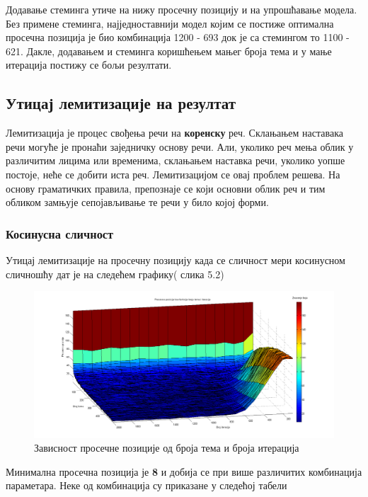 Додавање стеминга утиче на нижу просечну позицију и на упрошћавање модела. Без примене стеминга, најједноставнији модел којим се постиже оптимална просечна позиција је био комбинација 1200 - 693 док је са стемингом то 1100 - 621. Дакле, додавањем и стеминга коришћењем мањег броја тема и у мање итерација постижу се бољи резултати. 



\subsection{Утицај лемитизације на резултат}

Лемитизација је процес свођења речи на \textbf{коренску} реч. Склањањем наставака речи могуће је пронаћи заједничку основу речи. Али, уколико реч мења облик у различитим лицима или временима, склањањем наставка речи, уколико уопше постоје, неће се добити иста реч. Лемитизацијом се овај проблем решева. На основу граматичких правила, препознаје се који основни облик реч и тим обликом замњује сепојављивање те речи у било којој форми. 




\subsubsection{Косинусна сличност}



Утицај лемитизације на просечну позицију  када се сличност мери косинусном сличношћу дат је на следећем графику( слика 5.2)

		\begin{figure}[H]
    \centering
   \includegraphics[scale=0.3]{./Slike/LemmNoSyn.png} 
	\caption{Зависност просечне позиције од броја тема и броја итерација}
	\label{fig:slika1}
\end{figure}

Минимална просечна позиција је \textbf{8} и добија се при више различитих комбинација параметара. Неке од комбинација су приказане у следећој табели

